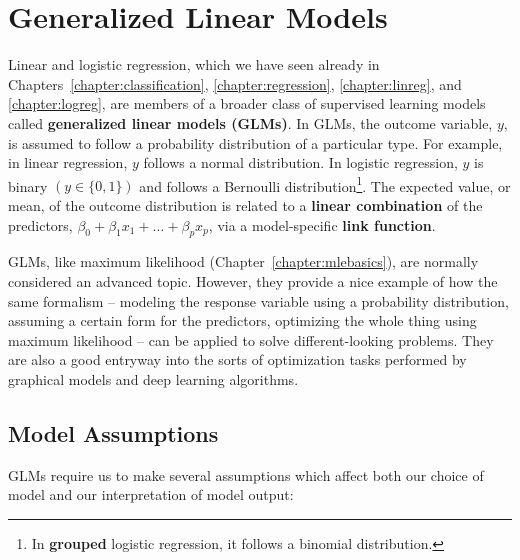 \chapter{Generalized Linear Models \label{chapter:glms}}

Linear and logistic regression, which we have seen already in Chapters~\ref{chapter:classification}, \ref{chapter:regression}, \ref{chapter:linreg}, and \ref{chapter:logreg}, are members of a broader class of supervised learning models called \textbf{generalized linear models (GLMs)}. In GLMs, the outcome variable, $y$, is assumed to follow a probability distribution of a particular type. For example, in linear regression, $y$ follows a normal distribution. In logistic regression, $y$ is binary $\left( y \in \{0, 1\} \right)$ and follows a Bernoulli distribution\footnote{In \textbf{grouped} logistic regression, it follows a binomial distribution.}. The expected value, or mean, of the outcome distribution is related to a \textbf{linear combination} of the predictors, $\beta_0 + \beta_1 x_1 + \dots + \beta_p x_p$, via a model-specific \textbf{link function}.

GLMs, like maximum likelihood (Chapter~\ref{chapter:mlebasics}), are normally considered an advanced topic. However, they provide a nice example of how the same formalism -- modeling the response variable using a probability distribution, assuming a certain form for the predictors, optimizing the whole thing using maximum likelihood -- can be applied to solve different-looking problems. They are also a good entryway into the sorts of optimization tasks performed by graphical models and deep learning algorithms. 


\section{Model Assumptions}

GLMs require us to make several assumptions which affect both our choice of model and our interpretation of model output:


